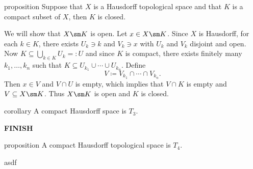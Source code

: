 \documentclass[class=article, crop=false]{standalone}
\begin{document}
\begin{result}{proposition}
  Suppose that $X$ is a Hausdorff topological space and that $K$ is a compact subset of $X$, then $K$ is closed.
\end{result}
\begin{pf}
  We will show that $X \sm K$ is open. Let $x \in X \sm K$. Since $X$ is Hausdorff, for each $k \in K$, there exists $U_k \ni k$ and $V_k \ni x$ with $U_k$ and $V_k$ disjoint and open. Now $K \subseteq \bigcup_{k \in K}^{} U_k = \colon U$ and since $K$ is compact, there exists finitely many $k_1, \ldots, k_n$ such that $K \subseteq U_{k_1} \cup \cdots \cup U_{k_n}$. Define
    \[
      V \coloneqq V_{k_1} \cap \cdots \cap V_{k_n}.
    \]
  Then $x \in V$ and $V \cap U$ is empty, which implies that $V \cap K$ is empty and $V \subseteq X \sm K$. Thus $X \sm K$ is open and $K$ is closed.
\end{pf}

\begin{result}{corollary}
  A compact Hausdorff space is $T_3$.
\end{result}
\begin{pf}
  \textbf{FINISH}
\end{pf}

\begin{result}{proposition}
  A compact Hausdorff topological space is $T_4$.
\end{result}
\begin{pf}
  asdf
\end{pf}
\end{document}

